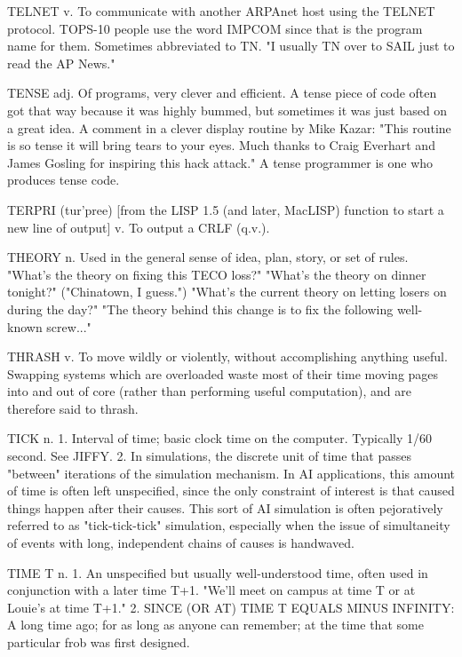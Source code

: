 TELNET v. To communicate with another ARPAnet host using the TELNET
   protocol.  TOPS-10 people use the word IMPCOM since that is the
   program name for them.  Sometimes abbreviated to TN.	 "I usually TN
   over to SAIL just to read the AP News."

TENSE adj. Of programs, very clever and efficient.  A tense piece of
   code often got that way because it was highly bummed, but sometimes
   it was just based on a great idea.  A comment in a clever display
   routine by Mike Kazar: "This routine is so tense it will bring
   tears to your eyes.	Much thanks to Craig Everhart and James
   Gosling for inspiring this hack attack."  A tense programmer is one
   who produces tense code.

TERPRI (tur'pree) [from the LISP 1.5 (and later, MacLISP) function to
   start a new line of output] v. To output a CRLF (q.v.).

THEORY n. Used in the general sense of idea, plan, story, or set of
   rules.  "What's the theory on fixing this TECO loss?"  "What's the
   theory on dinner tonight?"  ("Chinatown, I guess.")	"What's the
   current theory on letting losers on during the day?"	 "The theory
   behind this change is to fix the following well-known screw..."

THRASH v. To move wildly or violently, without accomplishing anything
   useful.  Swapping systems which are overloaded waste most of their
   time moving pages into and out of core (rather than performing
   useful computation), and are therefore said to thrash.

TICK n. 1. Interval of time; basic clock time on the computer.
   Typically 1/60 second.  See JIFFY.  2. In simulations, the discrete
   unit of time that passes "between" iterations of the simulation
   mechanism.  In AI applications, this amount of time is often left
   unspecified, since the only constraint of interest is that caused
   things happen after their causes.  This sort of AI simulation is
   often pejoratively referred to as "tick-tick-tick" simulation,
   especially when the issue of simultaneity of events with long,
   independent chains of causes is handwaved.

TIME T n. 1. An unspecified but usually well-understood time, often
   used in conjunction with a later time T+1.  "We'll meet on campus
   at time T or at Louie's at time T+1."  2. SINCE (OR AT) TIME T
   EQUALS MINUS INFINITY: A long time ago; for as long as anyone can
   remember; at the time that some particular frob was first designed.

